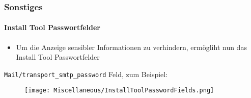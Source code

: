 
\begin{frame}[fragile]
	\frametitle{Sonstiges}
	\framesubtitle{Install Tool Passwortfelder}

	\begin{itemize}
		\item Um die Anzeige sensibler Informationen zu verhindern, 
			ermögliht nun das Install Tool Passwortfelder
	\end{itemize}

	\tabto{0.3cm} \texttt{Mail/transport\_smtp\_password} Feld, zum Beispiel:

	\begin{figure}
		\texttt{[image: Miscellaneous/InstallToolPasswordFields.png]}
	\end{figure}

\end{frame}

